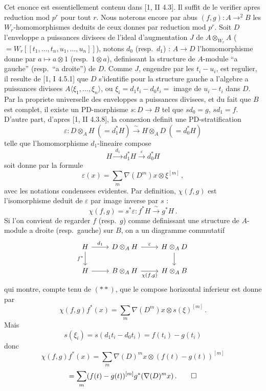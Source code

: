 \documentclass[12pt,a4paper]{article}
\theoremstyle{plain}
\theoremstyle{definition}
\theoremstyle{remark}
\begin{document}
Cet enonce est essentiellement contenu dans [1, II 4.3]. Il suffit de le verifier apres reduction mod $p^r$ pour tout $r$. Nous noterons encore par abus $(f,g) : A \to^2 B$ les $W_r$-homomorphismes deduits de ceux donnes par reduction mod $p^r$. Soit $D$ l'enveloppe a puissances divisees de l'ideal d'augmentation $J$ de $A \otimes_{W_r} A$ ($= W_r[[t_1, \ldots, t_n, u_1, \ldots, u_n]]$), notons $d_0$ (resp.\ $d_1$) : $A \to D$ l'homomorphisme donne par $a \mapsto a \otimes 1$ (resp.\ $1 \otimes a$), definissant la structure de $A$-module ``a gauche'' (resp.\ ``a droite'') de $D$. Comme $J$, engendre par les $t_i - u_i$, est regulier, il resulte de [1, I 4.5.1] que $D$ s'identifie pour la structure gauche a l'algebre a puissances divisees $A\langle \xi_1, \ldots, \xi_n \rangle$, ou $\xi_i = d_1t_i - d_0t_i =$ image de $u_i - t_i$ dans $D$. Par la propriete universelle des enveloppes a puissances divisees, et du fait que $B$ est complet, il existe un PD-morphisme $s : D \to B$ tel que $sd_0 = g$, $sd_1 = f$. D'autre part, d'apres [1, II 4.3.8], la connexion definit une PD-stratification
\[
\varepsilon : D \otimes_A H\ (= d_1^*H) \xrightarrow{\;\sim\;} H \otimes_A D\ (= d_0^*H)
\]
telle que l'homomorphisme $d_1$-lineaire compose
\[
H \xrightarrow{\;d_1\;} d_1^*H \xrightarrow{\;\varepsilon\;} d_0^*H
\]
soit donne par la formule
\begin{equation}\tag{$**$}
\varepsilon(x) = \sum_m \nabla(D^m)x \otimes \xi^{[m]}\,,
\end{equation}
avec les notations condensees evidentes. Par definition, $\chi(f,g)$ est l'isomorphisme deduit de $\varepsilon$ par image inverse par $s$ :
\[
\chi(f,g) = s^*\varepsilon : f^*H \xrightarrow{\;\sim\;} g^*H\,.
\]
Si l'on convient de regarder $f$ (resp.\ $g$) comme definissant une structure de $A$-module a droite (resp.\ gauche) sur $B$, on a un diagramme commutatif
\[
\begin{tikzcd}
H \rar{d_1} \dar[swap]{f^*} & D \otimes_A H \rar{\varepsilon} & H \otimes_A D \dar \\
H \rar & B \otimes_A H \rar[swap]{\chi(f,g)} & H \otimes_A B
\end{tikzcd}
\]
qui montre, compte tenu de $(**)$, que le compose horizontal inferieur est donne par
\[
\chi(f,g)f^*(x) = \sum_m \nabla(D^m)x \otimes s(\xi)^{[m]}\,.
\]
Mais
\[
s(\xi_i) = s(d_1t_i - d_0t_i) = f(t_i) - g(t_i)
\]
donc
\[
\chi(f,g)f^*(x) = \sum_m \nabla(D)^m x \otimes (f(t)-g(t))^{[m]}
\]
\[
= \sum_m (f(t)-g(t))^{[m]} g^*(\nabla(D)^m x)\,.\qedhere
\]

\subsubsection{}
\end{document}

